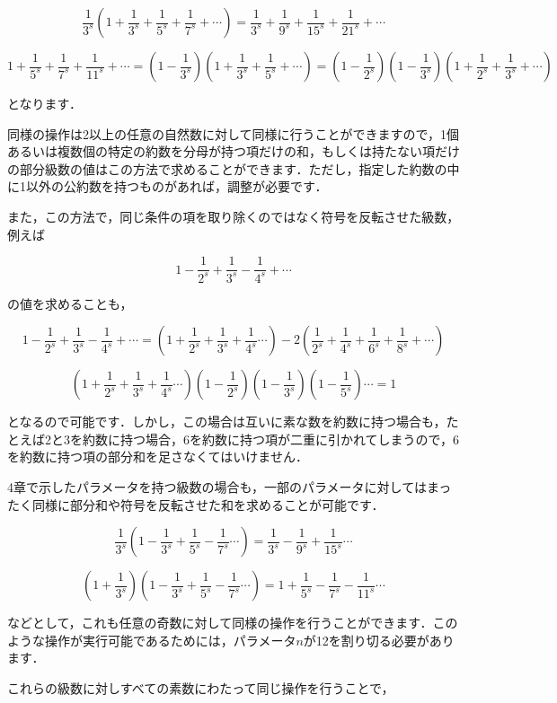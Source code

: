 \documentclass[./main]{subfiles}
\theoremstyle{break}
\begin{document}
\[\frac{1}{3^s}\left( 1+\frac{1}{3^s}+\frac{1}{5^s}+\frac{1}{7^s}+\cdots \right)=\frac{1}{3^s}+\frac{1}{9^s}+\frac{1}{15^s}+\frac{1}{21^s}+\cdots\]

\[1+\frac{1}{5^s}+\frac{1}{7^s}+\frac{1}{11^s}+\cdots=\left( 1-\frac{1}{3^s} \right)\left( 1+\frac{1}{3^s}+\frac{1}{5^s}+\cdots \right)=\left( 1-\frac{1}{2^s} \right)\left( 1-\frac{1}{3^s} \right)\left( 1+\frac{1}{2^s}+\frac{1}{3^s}+\cdots \right)\]

となります．

同様の操作は2以上の任意の自然数に対して同様に行うことができますので，1個あるいは複数個の特定の約数を分母が持つ項だけの和，もしくは持たない項だけの部分級数の値はこの方法で求めることができます．ただし，指定した約数の中に1以外の公約数を持つものがあれば，調整が必要です．

また，この方法で，同じ条件の項を取り除くのではなく符号を反転させた級数，例えば

\[1-\frac{1}{2^s}+\frac{1}{3^s}-\frac{1}{4^s}+\cdots\]

の値を求めることも，

\[1-\frac{1}{2^s}+\frac{1}{3^s}-\frac{1}{4^s}+\cdots= \left(1+\frac{1}{2^s}+\frac{1}{3^s}+\frac{1}{4^s}\cdots \right)-2\left(\frac{1}{2^s}+\frac{1}{4^s}+\frac{1}{6^s}+\frac{1}{8^s}+\cdots \right)\]

\[\left( 1+\frac{1}{2^s}+\frac{1}{3^s}+\frac{1}{4^s}\cdots \right)\left( 1-\frac{1}{2^s} \right)\left( 1-\frac{1}{3^s} \right)\left( 1-\frac{1}{5^s} \right)\cdots=1\]

となるので可能です．しかし，この場合は互いに素な数を約数に持つ場合も，たとえば2と3を約数に持つ場合，6を約数に持つ項が二重に引かれてしまうので，6を約数に持つ項の部分和を足さなくてはいけません．

4章で示したパラメータを持つ級数の場合も，一部のパラメータに対してはまったく同様に部分和や符号を反転させた和を求めることが可能です．

\[\frac{1}{3^s}\left(1-\frac{1}{3^s}+\frac{1}{5^s}-\frac{1}{7^s}\cdots\right)=\frac{1}{3^s}-\frac{1}{9^s}+\frac{1}{15^s}\cdots\]

\[\left( 1+\frac{1}{3^s} \right)\left( 1-\frac{1}{3^s}+\frac{1}{5^s}-\frac{1}{7^s}\cdots \right)=1+\frac{1}{5^s}-\frac{1}{7^s}-\frac{1}{11^s}\cdots\]

などとして，これも任意の奇数に対して同様の操作を行うことができます．このような操作が実行可能であるためには，パラメータ$n$が12を割り切る必要があります．

これらの級数に対しすべての素数にわたって同じ操作を行うことで，
\end{document}
